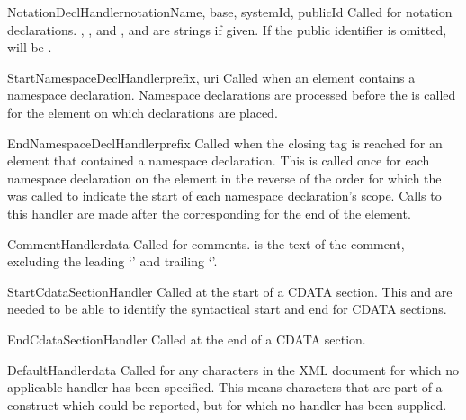 \begin{methoddesc}[xmlparser]{NotationDeclHandler}{notationName, base,
                                                   systemId, publicId}
Called for notation declarations.  , , and
, and  are strings if given.  If the
public identifier is omitted,  will be .
\end{methoddesc}

\begin{methoddesc}[xmlparser]{StartNamespaceDeclHandler}{prefix, uri}
Called when an element contains a namespace declaration.  Namespace
declarations are processed before the  is
called for the element on which declarations are placed.
\end{methoddesc}

\begin{methoddesc}[xmlparser]{EndNamespaceDeclHandler}{prefix}
Called when the closing tag is reached for an element 
that contained a namespace declaration.  This is called once for each
namespace declaration on the element in the reverse of the order for
which the  was called to indicate
the start of each namespace declaration's scope.  Calls to this
handler are made after the corresponding 
for the end of the element.
\end{methoddesc}

\begin{methoddesc}[xmlparser]{CommentHandler}{data}
Called for comments.   is the text of the comment, excluding
the leading `\code{<!-}\code{-}' and trailing `\code{-}\code{->}'.
\end{methoddesc}

\begin{methoddesc}[xmlparser]{StartCdataSectionHandler}{}
Called at the start of a CDATA section.  This and
 are needed to be able to identify
the syntactical start and end for CDATA sections.
\end{methoddesc}

\begin{methoddesc}[xmlparser]{EndCdataSectionHandler}{}
Called at the end of a CDATA section.
\end{methoddesc}

\begin{methoddesc}[xmlparser]{DefaultHandler}{data}
Called for any characters in the XML document for
which no applicable handler has been specified.  This means
characters that are part of a construct which could be reported, but
for which no handler has been supplied. 
\end{methoddesc}


